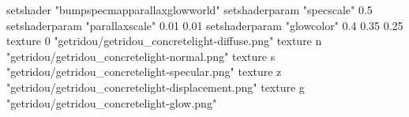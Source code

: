 setshader "bumpspecmapparallaxglowworld"
setshaderparam "specscale" 0.5
setshaderparam "parallaxscale" 0.01 0.01
setshaderparam "glowcolor" 0.4 0.35 0.25
texture 0 "getridou/getridou_concretelight-diffuse.png"
texture n "getridou/getridou_concretelight-normal.png"
texture s "getridou/getridou_concretelight-specular.png"
texture z "getridou/getridou_concretelight-displacement.png"
texture g "getridou/getridou_concretelight-glow.png"
